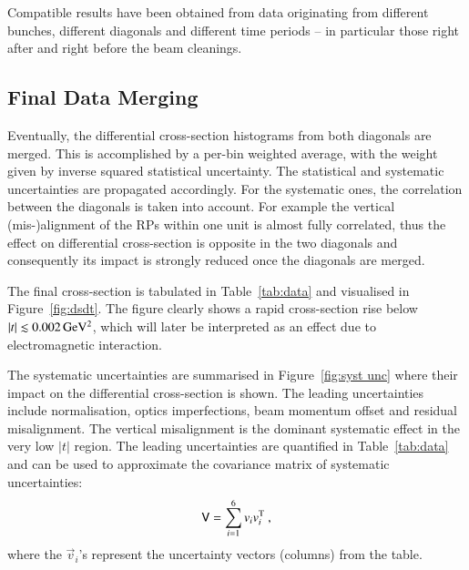 Compatible results have been obtained from data originating from different bunches, different diagonals and different time periods -- in particular those right after and right before the beam cleanings.



\subsection{Final Data Merging}
\label{sec:final data merging}

Eventually, the differential cross-section histograms from both diagonals are merged. This is accomplished by a per-bin weighted average, with the weight given by inverse squared statistical uncertainty. The statistical and systematic uncertainties are propagated accordingly. For the systematic ones, the correlation between the diagonals is taken into account. For example the vertical (mis-)alignment of the RPs within one unit is almost fully correlated, thus the effect on differential cross-section is opposite in the two diagonals and consequently its impact is strongly reduced once the diagonals are merged.

The final cross-section is tabulated in Table~\ref{tab:data} and visualised in Figure~\ref{fig:dsdt}. The figure clearly shows a rapid cross-section rise below $|t| \lesssim 0.002\,{\rm GeV^2}$, which will later be interpreted as an effect due to electromagnetic interaction.

The systematic uncertainties are summarised in Figure~\ref{fig:syst unc} where their impact on the differential cross-section is shown. The leading uncertainties include normalisation, optics imperfections, beam momentum offset and residual misalignment. The vertical misalignment is the dominant systematic effect in the very low $|t|$ region. The leading uncertainties are quantified in Table~\ref{tab:data} and can be used to approximate the covariance matrix of systematic uncertainties:
\begin{equation}
\label{eq:covar mat}
\mathsf{V} = \sum_{i=1}^{6} v_i v_i^{\rm T}\ ,
\end{equation}
where the $\vec v_i$'s represent the uncertainty vectors (columns) from the table.







